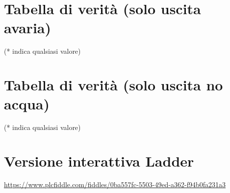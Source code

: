 \documentclass{article}
\begin{document}
    \section{Tabella di verità (solo uscita avaria)}

    \begin{table}[H]
    \centering
    \end{table}

    (* indica qualsiasi valore)

    \section{Tabella di verità (solo uscita no acqua)}

    \begin{table}[H]
    \centering
    \end{table}

    (* indica qualsiasi valore)

    \section{Versione interattiva Ladder}

    \href{https://www.plcfiddle.com/fiddles/0ba557fc-5503-49ed-a362-f94b0fa231a3}{https://www.plcfiddle.com/fiddles/0ba557fc-5503-49ed-a362-f94b0fa231a3}
\end{document}
